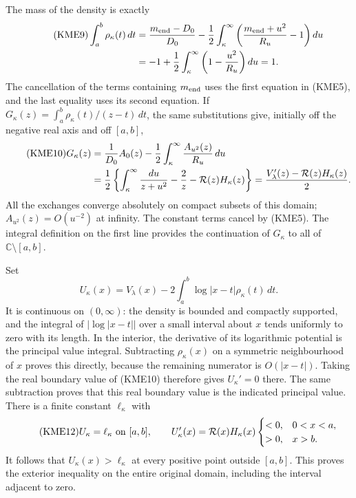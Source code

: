 \documentclass[11pt,a4paper]{article}
\begin{document}
The mass of the density is exactly
\begin{align}\tag{KME9}
 \int_a^b\rho_\kappa(t)\,dt
 &=\frac{m_{\rm end}-D_0}{D_0}
   -\frac12\int_\kappa^\infty\left(\frac{m_{\rm end}+u^2}{R_u}-1\right)du\\
 &=-1+\frac12\int_\kappa^\infty
                  \left(1-\frac{u^2}{R_u}\right)du=1.\notag
\end{align}
The cancellation of the terms containing $m_{\rm end}$ uses the first equation
in (KME5), and the last equality uses its second equation.
If $G_\kappa(z)=\int_a^b\rho_\kappa(t)/(z-t)\,dt$, the same substitutions give,
initially off the negative real axis and off $[a,b]$,
\begin{align}\tag{KME10}
 G_\kappa(z)&=\frac1{D_0}A_0(z)
                   -\frac12\int_\kappa^\infty\frac{A_{u^2}(z)}{R_u}\,du\\
 &=\frac12\left\{\int_\kappa^\infty\frac{du}{z+u^2}-\frac2z
                            -\mathcal R(z)H_\kappa(z)\right\}
   =\frac{V'_\lambda(z)-\mathcal R(z)H_\kappa(z)}2.\notag
\end{align}
All the exchanges converge absolutely on compact subsets of this
domain; $A_{u^2}(z)=O(u^{-2})$ at infinity. The constant terms cancel
by (KME5). The integral definition on the first line provides the
continuation of $G_\kappa$ to all of $\mathbb C\setminus[a,b]$.

Set
\begin{equation}\tag{KME11}
 U_\kappa(x)=V_\lambda(x)-2\int_a^b\log|x-t|\rho_\kappa(t)\,dt.
\end{equation}
It is continuous on $(0,\infty)$: the density is bounded and compactly
supported, and the integral of $|\log|x-t||$ over a small interval
about $x$ tends uniformly to zero with its length.  In the interior,
the derivative of its logarithmic potential is the principal value
integral. Subtracting $\rho_\kappa(x)$ on a symmetric neighbourhood of $x$
proves this directly, because the remaining numerator is $O(|x-t|)$.
Taking the real boundary value of (KME10) therefore gives $U_\kappa'=0$
there. The same subtraction proves that this real boundary value is
the indicated principal value. There is a finite constant $\ell_\kappa$ with
\begin{equation}\tag{KME12}
 U_\kappa=\ell_\kappa\ \hbox{on }[a,b],\qquad
 U_\kappa'(x)=\mathcal R(x)H_\kappa(x)
 \begin{cases}<0,&0<x<a,\\>0,&x>b.\end{cases}
\end{equation}
It follows that $U_\kappa(x)>\ell_\kappa$ at every positive point outside
$[a,b]$.  This proves the exterior inequality on the entire original
domain, including the interval adjacent to zero.
\end{document}
